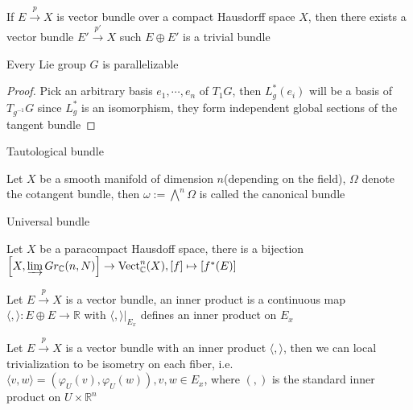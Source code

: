 \documentclass[main]{subfiles}
\begin{document}
\begin{theorem}\label{X compact Hausdorff => E has complement}
If $E\overset{p}{\rightarrow}X$ is vector bundle over a compact Hausdorff space $X$, then there exists a vector bundle $E'\overset{p'}{\rightarrow}X$ such $E\oplus E'$ is a trivial bundle
\end{theorem}

\begin{proposition}
Every Lie group $G$ is parallelizable
\end{proposition}

\begin{proof}
Pick an arbitrary basis $e_1,\cdots,e_n$ of $T_1G$, then $L_g^*(e_i)$ will be a basis of $T_{g^{-1}}G$ since $L_g^*$ is an isomorphism, they form independent global sections of the tangent bundle
\end{proof}

\begin{definition}
Tautological bundle
\end{definition}

\begin{definition}
Let $X$ be a smooth manifold of dimension $n$(depending on the field), $\Omega$ denote the cotangent bundle, then $\omega:=\bigwedge^n\Omega$ is called the canonical bundle
\end{definition}

\begin{definition}
Universal bundle
\end{definition}

\begin{theorem}
Let $X$ be a paracompact Hausdoff space, there is a bijection $\left[X,\varinjlim Gr_{\mathbb C}(n,N)\right]\to\mathrm{Vect}_{\mathbb C}^{n}(X),[f]\mapsto[f^*(E)]$
\end{theorem}

\begin{definition}
Let $E\overset{p}{\rightarrow}X$ is a vector bundle, an inner product is a continuous map $\langle,\rangle: E\oplus E\rightarrow\mathbb R$ with $\langle,\rangle|_{E_x}$ defines an inner product on $E_x$
\end{definition}

\begin{proposition}
Let $E\overset{p}{\rightarrow}X$ is a vector bundle with an inner product $\langle,\rangle$, then we can local trivialization to be isometry on each fiber, i.e. $\langle v,w\rangle=\left(\varphi_U(v),\varphi_U(w)\right), v,w\in E_x$, where $(,)$ is the standard inner product on $U\times\mathbb R^n$
\end{proposition}
\end{document}

